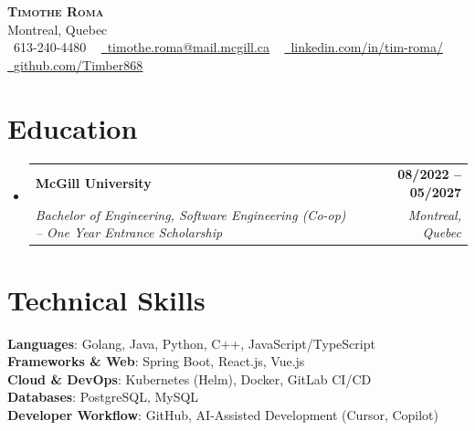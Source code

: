 \documentclass[letterpaper,11pt]{article}
\makeatletter
\newcommand{\resumeSubHeadingListStart}{%
  \begin{itemize}[leftmargin=0.0in,label={},topsep=0pt,itemsep=0pt,parsep=0pt,partopsep=0pt]
}
\newcommand{\resumeSubHeadingListEnd}{\end{itemize}}
\newcommand{\resumeSubheading}[4]{ \vspace{-2pt}
    \item \begin{tabular*}{1.0\textwidth}[t]{l@{\extracolsep{\fill}}r} 
        \textbf{#1} & \textbf{\small #2} \\ \textit{\small#3} & \textit{\small #4} \\ 
    \end{tabular*}\vspace{-7pt} 
}
\makeatother
\begin{document}
\begin{center}
    {\Huge \scshape \textbf{Timothe Roma}} \\ \vspace{5pt}
    Montreal, Quebec\\ \vspace{5pt}
    \small \raisebox{-0.1\height}\faPhone\ 613-240-4480 ~ \href{mailto:timothe.roma@mail.mcgill.ca}{\raisebox{-0.2\height}\faEnvelope\  \underline{timothe.roma@mail.mcgill.ca}} ~ 
    \href{https://linkedin.com/in/tim-roma/}{\raisebox{-0.2\height}\faLinkedin\ \underline{linkedin.com/in/tim-roma/}}  ~
    \href{https://github.com/Timber868}{\raisebox{-0.2\height}\faGithub\ \underline{github.com/Timber868}}
    \vspace{-8pt}
\end{center}
\vspace{6pt}

\section{Education}
\vspace{13pt}
\resumeSubHeadingListStart
  \resumeSubheading
    {McGill University}{08/2022 -- 05/2027}
    {Bachelor of Engineering, Software Engineering (Co-op) -- One Year Entrance Scholarship}
    {Montreal, Quebec}
\resumeSubHeadingListEnd

\section{Technical Skills}
\vspace{10pt}
 \begin{itemize}[leftmargin=0.15in, label={}]
    \small{\item{
     \textbf{Languages}{: Golang, Java, Python, C++, JavaScript/TypeScript} \\
     \textbf{Frameworks \& Web}{: Spring Boot, React.js, Vue.js} \\
     \textbf{Cloud \& DevOps}{: Kubernetes (Helm), Docker, GitLab CI/CD} \\
     \textbf{Databases}{: PostgreSQL, MySQL} \\
     \textbf{Developer Workflow}{: GitHub, AI-Assisted Development (Cursor, Copilot)}
    }}
 \end{itemize}
 \vspace{-20pt}

\end{document}
